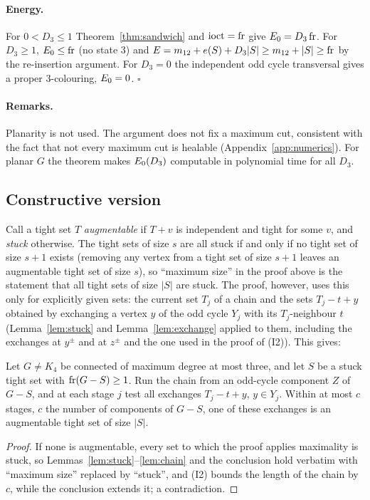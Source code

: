 \paragraph*{Energy.} For $0<D_3\le1$ Theorem~\ref{thm:sandwich} and $\operatorname{ioct}=\operatorname{fr}$ give
$E_0=D_3\operatorname{fr}$. For $D_3\ge1$, $E_0\le\operatorname{fr}$ (no state 3) and
$E=m_{12}+e(S)+D_3|S|\ge m_{12}+|S|\ge\operatorname{fr}$ by the re-insertion argument. For $D_3=0$ the
independent odd cycle transversal gives a proper 3-colouring, $E_0=0$. \hfill$\square$



\paragraph*{Remarks.} Planarity is not used. The argument does not fix a maximum cut, consistent
with the fact that not every maximum cut is healable (Appendix~\ref{app:numerics}). For planar $G$
the theorem makes $E_0(D_3)$ computable in polynomial time for all $D_3$.

\subsection*{Constructive version}
Call a tight set $T$ \emph{augmentable} if $T+v$ is independent and tight for some $v$, and
\emph{stuck} otherwise. The tight sets of size $s$ are all stuck if and only if no tight set of
size $s+1$ exists (removing any vertex from a tight set of size $s+1$ leaves an augmentable tight
set of size $s$), so ``maximum size'' in the proof above is the statement that all tight sets of
size $|S|$ are stuck. The proof, however, uses this only for explicitly given sets: the current
set $T_j$ of a chain and the sets $T_j-t+y$ obtained by exchanging a vertex $y$ of the odd cycle
$Y_j$ with its $T_j$-neighbour $t$ (Lemma~\ref{lem:stuck} and Lemma~\ref{lem:exchange} applied to
them, including the exchanges at $y^\pm$ and at $z^\pm$ and the one used in the proof of (I2)).
This gives:

\begin{proposition}\label{prop:constructive}
Let $G\ne K_4$ be connected of maximum degree at most three, and let $S$ be a stuck tight set
with $\operatorname{fr}(G-S)\ge1$. Run the chain from an odd-cycle component $Z$ of $G-S$, and at each stage $j$
test all exchanges $T_j-t+y$, $y\in Y_j$. Within at most $c$ stages, $c$ the number of components
of $G-S$, one of these exchanges is an augmentable tight set of size $|S|$.
\end{proposition}
\begin{proof}
If none is augmentable, every set to which the proof applies maximality is stuck, so
Lemmas~\ref{lem:stuck}--\ref{lem:chain} and the conclusion hold verbatim with ``maximum size''
replaced by ``stuck'', and (I2) bounds the length of the chain by $c$, while the conclusion
extends it; a contradiction.
\end{proof}

